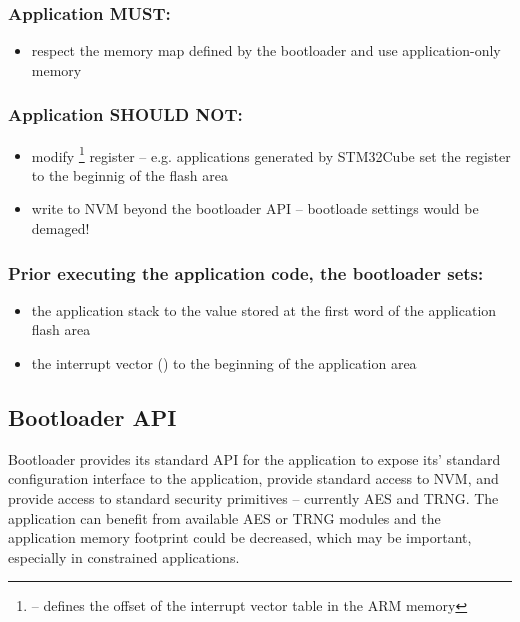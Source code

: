 \subsubsection*{Application MUST:}
\begin{itemize}
  \item respect the memory map defined by the bootloader and use application-only memory
\end{itemize}

\subsubsection*{Application SHOULD NOT:}
\begin{itemize}
  \item modify \footnote{ -- defines the offset of the interrupt vector table in the ARM memory} register -- e.g. applications generated by STM32Cube set the  register to the beginnig of the flash area
  \item write to NVM beyond the bootloader API -- bootloade settings would be demaged!
\end{itemize}

\subsubsection*{Prior executing the application code, the bootloader sets:}
\begin{itemize}
  \item the application stack to the value stored at the first word of the application flash area
  \item the interrupt vector () to the beginning of the application area
\end{itemize}

\clearpage
\subsection{Bootloader API} \label{sec:api}

Bootloader provides its standard API for the application to expose its' standard configuration interface to the application,
provide standard access to NVM, and provide access to standard security primitives -- currently AES and TRNG. 
The application can benefit from available AES or TRNG modules and the application memory footprint could be decreased, which may be important, especially in constrained applications.

